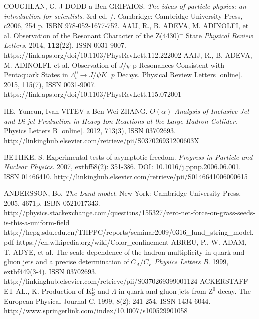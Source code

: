 \documentclass[thesismargins, thesislinespacing]{rnthesis}
\begin{document}
\begin{thebibliography}{}
COUGHLAN, G, J DODD a Ben GRIPAIOS. \textit{The ideas of particle physics: an introduction for scientists}. 3rd ed. /. Cambridge: Cambridge University Press, c2006, 254 p. ISBN 978-052-1677-752.
AAIJ, R., B. ADEVA, M. ADINOLFI, et al. Observation of the Resonant Character of the Z(4430)$^{-}$ State \textit{Physical Review Letters}. 2014, \textbf{112}(22). ISSN 0031-9007. https://link.aps.org/doi/10.1103/PhysRevLett.112.222002
AAIJ, R., B. ADEVA, M. ADINOLFI, et al. Observation of $J / \psi$ p Resonances Consistent with Pentaquark States in $\Lambda_b^0 \rightarrow J / \psi K^{-}p$ Decays. Physical Review Letters [online]. 2015, 115(7),  ISSN 0031-9007. https://link.aps.org/doi/10.1103/PhysRevLett.115.072001

HE, Yuncun, Ivan VITEV a Ben-Wei ZHANG. 
\textit{ $O(\alpha)$ Analysis of Inclusive Jet and Di-jet Production in Heavy Ion Reactions at the Large Hadron Collider}. Physics Letters B [online]. 2012, 713(3), ISSN 03702693. http://linkinghub.elsevier.com/retrieve/pii/S037026931200603X

BETHKE, S. Experimental tests of asymptotic freedom. \textit{Progress in Particle and Nuclear Physics}. 2007, extbf{58}(2): 351-386. DOI: 10.1016/j.ppnp.2006.06.001. ISSN 01466410.  http://linkinghub.elsevier.com/retrieve/pii/S0146641006000615

ANDERSSON, Bo. \textit{The Lund model}. New York: Cambridge University Press, 2005, 4671p. ISBN 0521017343.
http://physics.stackexchange.com/questions/155327/zero-net-force-on-grass-seeds-is-this-a-uniform-field
http://hepg.sdu.edu.cn/THPPC/reports/seminar2009/0316\_lund\_string\_model.pdf
https://en.wikipedia.org/wiki/Color\_confinement
ABREU, P., W. ADAM, T. ADYE, et al. The scale dependence of the hadron multiplicity in quark and gluon jets and a precise determination of $C_A/C_F$ \textit{Physics Letters B}. 1999, extbf{449}(3-4). ISSN 03702693.  http://linkinghub.elsevier.com/retrieve/pii/S0370269399001124
ACKERSTAFF ET AL., K. Production of ${\rm K}^0_{\rm S}$ and $\Lambda$ in quark and gluon jets from $\mathrm{Z^0}$ decay. The European Physical Journal C. 1999, 8(2): 241-254. ISSN 1434-6044.
http://www.springerlink.com/index/10.1007/s100529901058


\end{thebibliography}
\end{document}
